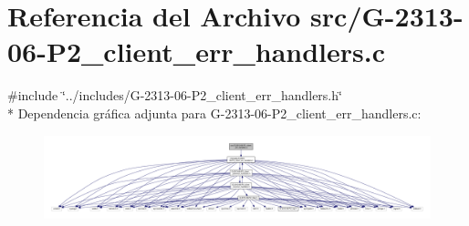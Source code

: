\hypertarget{G-2313-06-P2__client__err__handlers_8c}{}\section{Referencia del Archivo src/\+G-\/2313-\/06-\/\+P2\+\_\+client\+\_\+err\+\_\+handlers.c}
\label{G-2313-06-P2__client__err__handlers_8c}
{\ttfamily \#include \char`\"{}../includes/\+G-\/2313-\/06-\/\+P2\+\_\+client\+\_\+err\+\_\+handlers.\+h\char`\"{}}\\*
Dependencia gráfica adjunta para G-\/2313-\/06-\/\+P2\+\_\+client\+\_\+err\+\_\+handlers.c\+:\nopagebreak
\begin{figure}[H]
\begin{center}
\leavevmode
\includegraphics[width=350pt]{G-2313-06-P2__client__err__handlers_8c__incl}
\end{center}
\end{figure}
